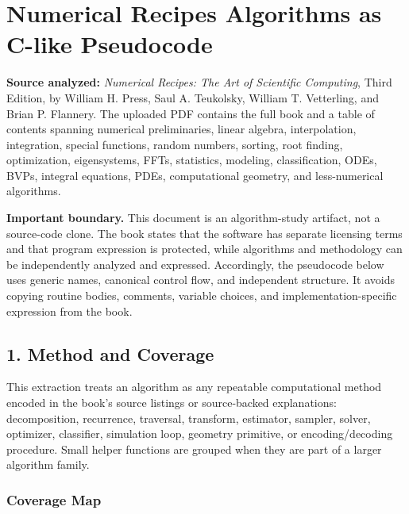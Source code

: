 \documentclass[11pt]{article}
\begin{document}
\section{Numerical Recipes Algorithms as C-like Pseudocode}\label{numerical-recipes-algorithms-as-c-like-pseudocode}

\textbf{Source analyzed:} \emph{Numerical Recipes: The Art of Scientific Computing}, Third Edition, by William H. Press, Saul A. Teukolsky, William T. Vetterling, and Brian P. Flannery. The uploaded PDF contains the full book and a table of contents spanning numerical preliminaries, linear algebra, interpolation, integration, special functions, random numbers, sorting, root finding, optimization, eigensystems, FFTs, statistics, modeling, classification, ODEs, BVPs, integral equations, PDEs, computational geometry, and less-numerical algorithms.

\textbf{Important boundary.} This document is an algorithm-study artifact, not a source-code clone. The book states that the software has separate licensing terms and that program expression is protected, while algorithms and methodology can be independently analyzed and expressed. Accordingly, the pseudocode below uses generic names, canonical control flow, and independent structure. It avoids copying routine bodies, comments, variable choices, and implementation-specific expression from the book.

\subsection{1. Method and Coverage}\label{method-and-coverage}

This extraction treats an algorithm as any repeatable computational method encoded in the book's source listings or source-backed explanations: decomposition, recurrence, traversal, transform, estimator, sampler, solver, optimizer, classifier, simulation loop, geometry primitive, or encoding/decoding procedure. Small helper functions are grouped when they are part of a larger algorithm family.

\subsubsection{Coverage Map}\label{coverage-map}
\end{document}
